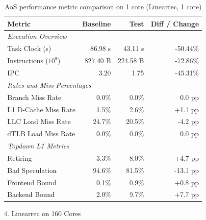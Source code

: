 \documentclass[leqno,11pt]{article}
\begin{document}
    \begin{table}[htbp]
      \centering
      \caption{AoS performance metric comparison on 1 core (Linearrec, 1 core)}
      \label{tab:perf_comparison_aos_linearrec_1core}
      \begin{tabular}{lrrr}
        \toprule
        \textbf{Metric} & \textbf{Baseline} & \textbf{Test} & \textbf{Diff / Change} \\
        \midrule
        \multicolumn{4}{l}{\textit{Execution Overview}} \\
        \quad Task Clock (s)           & 86.98 s   & 43.11 s   & -50.44\%   \\
        \quad Instructions ($10^9$)    & 827.40 B  & 224.58 B  & -72.86\%   \\
        \quad IPC                      & 3.20       & 1.75       & -45.31\%   \\
        \midrule
        \multicolumn{4}{l}{\textit{Rates and Miss Percentages}} \\
        \quad Branch Miss Rate         & 0.0\%      & 0.0\%      & 0.0 pp     \\
        \quad L1 D-Cache Miss Rate     & 1.5\%      & 2.6\%      & +1.1 pp    \\
        \quad LLC Load Miss Rate       & 24.7\%     & 20.5\%     & -4.2 pp    \\
        \quad dTLB Load Miss Rate      & 0.0\%      & 0.0\%      & 0.0 pp     \\
        \midrule
        \multicolumn{4}{l}{\textit{Topdown L1 Metrics}} \\
        \quad Retiring                 & 3.3\%      & 8.0\%      & +4.7 pp    \\
        \quad Bad Speculation          & 94.6\%     & 81.5\%     & -13.1 pp   \\
        \quad Frontend Bound           & 0.1\%      & 0.9\%      & +0.8 pp    \\
        \quad Backend Bound            & 2.0\%      & 9.7\%      & +7.7 pp    \\
        \bottomrule
      \end{tabular}
    \end{table}

  4. Linearrec on 160 Cores
\end{document}
